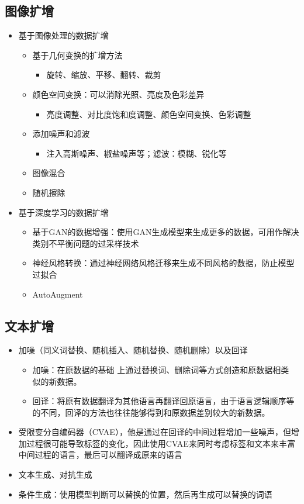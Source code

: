 \subsection{图像扩增}
\begin{itemize}
    \item 基于图像处理的数据扩增
    \begin{itemize}
        \item 基于几何变换的扩增方法
        \begin{itemize}
            \item 旋转、缩放、平移、翻转、裁剪
        \end{itemize}
        \item 颜色空间变换：可以消除光照、亮度及色彩差异
        \begin{itemize}
            \item 亮度调整、对比度饱和度调整、颜色空间变换、色彩调整
        \end{itemize}
        \item 添加噪声和滤波
        \begin{itemize}
            \item 注入高斯噪声、椒盐噪声等；滤波：模糊、锐化等
        \end{itemize}
        \item 图像混合
        \item 随机擦除
    \end{itemize}
    \item 基于深度学习的数据扩增
    \begin{itemize}
        \item 基于GAN的数据增强：使用GAN生成模型来生成更多的数据，可用作解决类别不平衡问题的过采样技术
        \item 神经风格转换：通过神经网络风格迁移来生成不同风格的数据，防止模型过拟合
        \item AutoAugment
    \end{itemize}
\end{itemize}

\subsection{文本扩增}
\begin{itemize}
    \item 加噪（同义词替换、随机插入、随机替换、随机删除）以及回译
    \begin{itemize}
        \item 加噪：在原数据的基础 上通过替换词、删除词等方式创造和原数据相类
        似的新数据。
        \item 回译：将原有数据翻译为其他语言再翻译回原语言，由于语言逻辑顺序等的不同，回译的方法也往往能够得到和原数据差别较大的新数据。
    \end{itemize}
    \item 受限变分自编码器（CVAE），他是通过在回译的中间过程增加一些噪声，但增加过程很可能导致标签的变化，因此使用CVAE来同时考虑标签和文本来丰富中间过程的语言，最后可以翻译成原来的语言
    \item 文本生成、对抗生成
    \item 条件生成：使用模型判断可以替换的位置，然后再生成可以替换的词语
\end{itemize}

